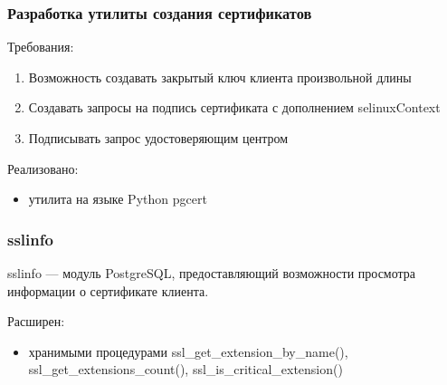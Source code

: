 \documentclass[xcolor={dvipsnames,table}]{beamer}
\begin{document}
\begin{frame}
 \frametitle{Разработка утилиты создания сертификатов}
  

Требования:
\begin{itemize}
\begin{enumerate}
  \item Возможность создавать закрытый ключ клиента произвольной длины
  \item Создавать запросы на подпись сертификата с дополнением selinuxContext
  \item Подписывать запрос удостоверяющим центром
\end{enumerate}
\end{itemize}

\vspace{1 em }

Реализовано:
\begin{itemize}
  \item утилита на языке Python pgcert
\end{itemize}

  
\end{frame}
\begin{frame}
 \frametitle{sslinfo}
  

sslinfo --- модуль PostgreSQL, предоставляющий возможности просмотра информации о сертификате клиента.

\vspace{1 em}

Расширен:
\begin{itemize}
  \item хранимыми процедурами ssl\_get\_extension\_by\_name(), ssl\_get\_extensions\_count(), ssl\_is\_critical\_extension()
\end{itemize}

  
\end{frame}
\end{document}
